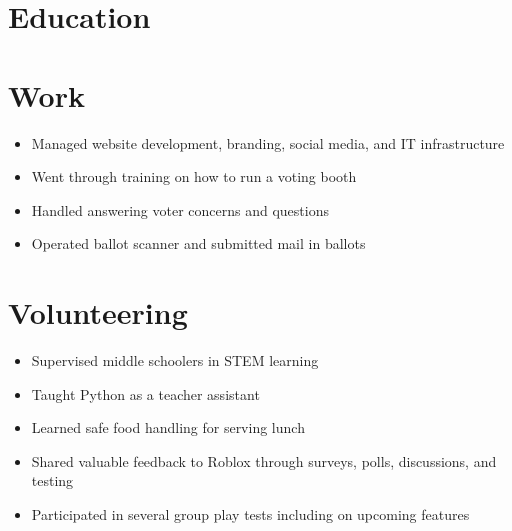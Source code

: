 \documentclass{my_cv} %
\begin{document}

\section{Education}



\section{Work}

\begin{itemize}
    \item Managed website development, branding, social media, and IT infrastructure
\end{itemize}

\begin{itemize}
    \item Went through training on how to run a voting booth
    \item Handled answering voter concerns and questions
    \item Operated ballot scanner and submitted mail in ballots
\end{itemize}

\section{Volunteering}

\begin{itemize}
    \item Supervised middle schoolers in STEM learning
    \item Taught Python as a teacher assistant
    \item Learned safe food handling for serving lunch
\end{itemize}

\begin{itemize}
    \item Shared valuable feedback to Roblox through surveys, polls, discussions, and testing
    \item Participated in several group play tests including on upcoming features
\end{itemize}
\end{document}
